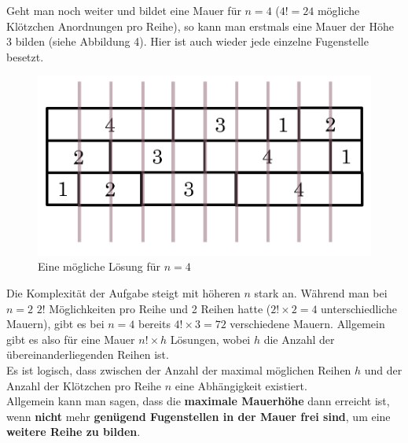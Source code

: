 \documentclass[a4paper,12pt]{article}
\begin{document}
Geht man noch weiter und bildet eine Mauer für $n = 4$ ($4! = 24$ mögliche Klötzchen Anordnungen pro Reihe), so kann man erstmals eine Mauer der Höhe 3 bilden (siehe Abbildung 4). Hier ist auch wieder jede einzelne Fugenstelle besetzt.
\begin{figure}[H]
    \centering
    \includegraphics[width=0.6\linewidth]{Bilder/Aufgabe1/Loesung_N4.png}
    \caption{Eine mögliche Lösung für $n = 4$}
\end{figure}

Die Komplexität der Aufgabe steigt mit höheren $n$ stark an. Während man bei $n = 2$ $2!$ Möglichkeiten pro Reihe und 2 Reihen hatte ($2!\times2 = 4$ unterschiedliche Mauern), gibt es bei $n = 4$ bereits $4!\times3 = 72$ verschiedene Mauern.
Allgemein gibt es also für eine Mauer $n!\times h$ Lösungen, wobei $h$ die Anzahl der übereinanderliegenden Reihen ist.
\\[0.4cm]
Es ist logisch, dass zwischen der Anzahl der maximal möglichen Reihen $h$ und der Anzahl der Klötzchen pro Reihe $n$ eine Abhängigkeit existiert.
\\[0.4cm]
Allgemein kann man sagen, dass die \textbf{maximale Mauerhöhe} dann erreicht ist, wenn \textbf{nicht} mehr \textbf{genügend Fugenstellen in der Mauer frei sind}, um eine \textbf{weitere Reihe zu bilden}.
\end{document}
